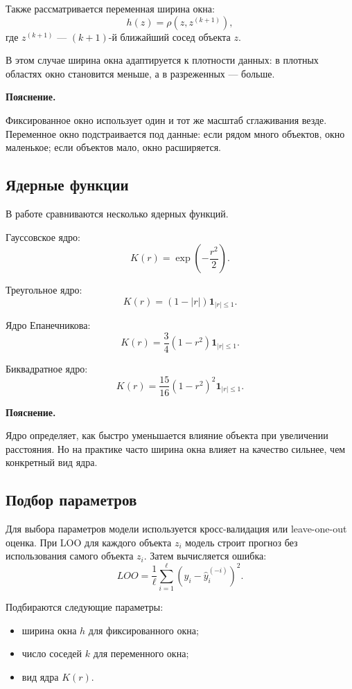 \documentclass[14pt,a4paper]{extarticle}
\newenvironment{explanation}
{
    \vspace{0.2cm}
    \noindent\textbf{Пояснение.}
}
{
    \vspace{0.2cm}
}
\begin{document}
Также рассматривается переменная ширина окна:
\[
h(z)=\rho(z,z^{(k+1)}),
\]
где \(z^{(k+1)}\) — \((k+1)\)-й ближайший сосед объекта \(z\).

В этом случае ширина окна адаптируется к плотности данных: в плотных областях окно становится меньше, а в разреженных — больше.

\begin{explanation}
Фиксированное окно использует один и тот же масштаб сглаживания везде. Переменное окно подстраивается под данные: если рядом много объектов, окно маленькое; если объектов мало, окно расширяется.
\end{explanation}

\subsection{Ядерные функции}

В работе сравниваются несколько ядерных функций.

Гауссовское ядро:
\[
K(r)=\exp\left(-\frac{r^2}{2}\right).
\]

Треугольное ядро:
\[
K(r)=(1-|r|)\mathbf{1}_{|r|\leq 1}.
\]

Ядро Епанечникова:
\[
K(r)=\frac{3}{4}(1-r^2)\mathbf{1}_{|r|\leq 1}.
\]

Биквадратное ядро:
\[
K(r)=\frac{15}{16}(1-r^2)^2\mathbf{1}_{|r|\leq 1}.
\]

\begin{explanation}
Ядро определяет, как быстро уменьшается влияние объекта при увеличении расстояния. Но на практике часто ширина окна влияет на качество сильнее, чем конкретный вид ядра.
\end{explanation}

\subsection{Подбор параметров}

Для выбора параметров модели используется кросс-валидация или leave-one-out оценка. При LOO для каждого объекта \(z_i\) модель строит прогноз без использования самого объекта \(z_i\). Затем вычисляется ошибка:
\[
LOO =
\frac{1}{\ell}
\sum_{i=1}^{\ell}
(y_i-\hat y_i^{(-i)})^2.
\]

Подбираются следующие параметры:
\begin{itemize}
    \item ширина окна \(h\) для фиксированного окна;
    \item число соседей \(k\) для переменного окна;
    \item вид ядра \(K(r)\).
\end{itemize}
\end{document}
